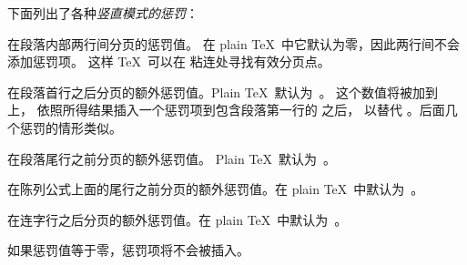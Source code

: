\documentclass{book}
\begin{document}
下面列出了各种\emph{竖直模式的惩罚}：
\begin{inventory}
\item [\cs{interlinepenalty}] 
      在段落内部两行间分页的惩罚值。 
      在 plain \TeX\ 中它默认为零，因此两行间不会添加惩罚项。
      这样 \TeX\ 可以在  粘连处寻找有效分页点。

\item [\cs{clubpenalty}] 
      在段落首行之后分页的额外惩罚值。Plain \TeX\ 默认为~。
      这个数值将被加到  上，
      依照所得结果插入一个惩罚项到包含段落第一行的  之后，
      以替代 。后面几个惩罚的情形类似。

\item [\cs{widowpenalty}] 
      在段落尾行之前分页的额外惩罚值。 Plain \TeX\ 默认为~。

\item [\cs{displaywidowpenalty}] 
      在陈列公式上面的尾行之前分页的额外惩罚值。在 plain \TeX\ 中默认为~。

\item [\cs{brokenpenalty}] 
      在连字行之后分页的额外惩罚值。在 plain \TeX\ 中默认为~。
\end{inventory}
如果惩罚值等于零，惩罚项将不会被插入。
\end{document}
